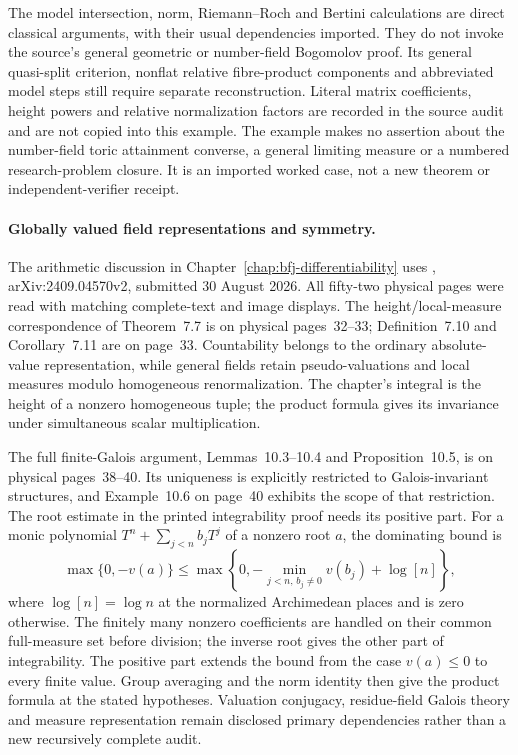 The model intersection, norm, Riemann--Roch and Bertini calculations are
direct classical arguments, with their usual dependencies imported.
They do not invoke the source's general geometric or number-field
Bogomolov proof.  Its general quasi-split criterion, nonflat relative
fibre-product components and abbreviated model steps still require
separate reconstruction.  Literal matrix coefficients, height powers
and relative normalization factors are recorded in the source audit
and are not copied into this example.  The example makes no assertion
about the number-field toric attainment converse, a general limiting
measure or a numbered research-problem closure.  It is an imported
worked case, not a new theorem or independent-verifier receipt.

\paragraph{Globally valued field representations and symmetry.}

The arithmetic discussion in Chapter~\ref{chap:bfj-differentiability}
uses \cite{BDHS26GVFFoundationsV2}, arXiv:2409.04570v2, submitted
30 August 2026.  All fifty-two physical pages were read with matching
complete-text and image displays.  The height/local-measure correspondence
of Theorem~7.7 is on physical pages~32--33; Definition~7.10 and
Corollary~7.11 are on page~33.  Countability belongs to the ordinary
absolute-value representation, while general fields retain pseudo-valuations
and local measures modulo homogeneous renormalization.  The chapter's
integral is the height of a nonzero homogeneous tuple; the product formula
gives its invariance under simultaneous scalar multiplication.

The full finite-Galois argument, Lemmas~10.3--10.4 and Proposition~10.5,
is on physical pages~38--40.  Its uniqueness is explicitly restricted to
Galois-invariant structures, and Example~10.6 on page~40 exhibits the
scope of that restriction.  The root estimate in the printed integrability
proof needs its positive part.  For a monic polynomial
$T^n+\sum_{j<n}b_jT^j$ of a nonzero root $a$, the dominating bound is
\[
 \max\{0,-v(a)\}
   \leq\max\left\{0,-\min_{j<n,\,b_j\ne0}v(b_j)+\log[n]\right\},
\]
where $\log[n]=\log n$ at the normalized Archimedean places and is zero
otherwise.  The finitely many nonzero coefficients are handled on their
common full-measure set before division; the inverse root gives the other
part of integrability.  The positive part extends the bound from the
case $v(a)\leq0$ to every finite value.  Group averaging and the norm
identity then give the product formula at the stated hypotheses.
Valuation conjugacy, residue-field Galois theory and measure representation
remain disclosed primary dependencies rather than a new recursively
complete audit.

